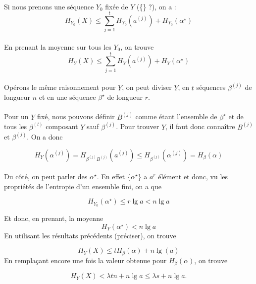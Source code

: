 	\paragraph{}
	Si nous prenons une séquence $Y_0$ fixée de $Y$ (\{\} ?), on a :
	\[H_{Y_0}(X)\le \sum_{j=1}^tH_{Y_0}\left(a^{(j)}\right)+H_{Y_0}(\alpha^\star)\]
	
	\paragraph{}
	En prenant la moyenne sur tous les $Y_0$, on trouve
	\[H_Y(X)\le \sum_{j=1}^tH_Y\left(a^{(j)}\right)+H_Y(\alpha^\star)\]
	
	\paragraph{}
	Opérons le même raisonnement pour $Y$, on peut diviser $Y$, en $t$ séquences $\beta^{(j)}$ de longueur $n$ et en une séquence ${\beta^\star}$ de longueur $r$. 
	
	\paragraph{}
	Pour un $Y$ fixé, nous pouvons définir $B^{(j)}$ comme étant l'ensemble de $\beta^\star$ et de tous les $\beta^{(l)}$ composant $Y$ sauf $\beta^{(j)}$.
	Pour trouver $Y$, il faut donc connaître $B^{(j)}$ et $\beta^{(j)}$. On a donc
	
	\[H_Y(\alpha^{(j)}) = H_{\beta^{(j)}B^{(j)}}\left(a^{(j)}\right) \le H_{\beta^{(j)}}\left(\alpha^{(j)}\right)=H_\beta(\alpha) \]
	
	\paragraph{}
	Du côté, on peut parler des $\alpha^\star$. En effet $\{\alpha^\star\}$ a $a^r$ élément et donc, vu les propriétés de l'entropie d'un ensemble fini, on a que
	
	\[H_{Y_0}(\alpha^\star) \le r\lg a < n\lg a\]
	
	Et donc, en prenant, la moyenne 
	\[H_Y(\alpha^\star) < n \lg a\]
	En utilisant les résultats précédents (préciser), on trouve
	
	\[H_Y(X)\le t H_\beta(\alpha) + n \lg(a)\]
	En remplaçant encore une fois la valeur obtenue pour $H_\beta(\alpha)$, on trouve
	
	\[H_Y(X)<\lambda t n + n \lg a \le \lambda s+n \lg a.\]
	

